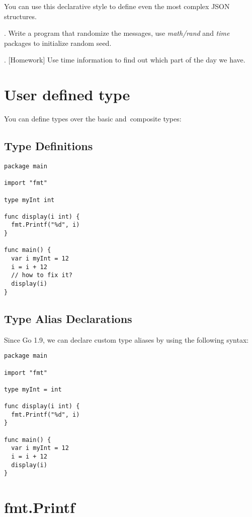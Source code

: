\documentclass[11pt, letterpaper]{article}
\begin{document}
You can use this declarative style to define even the most complex {\small JSON} structures.

. Write a program that randomize the messages, use \emph{math/rand} and \emph{time} packages to initialize random seed.

. [Homework] Use time information to find out which part of the day we have.

\section{User defined type}

You can define types over the basic and~composite types:

\subsection{Type Definitions}

\begin{verbatim}
package main

import "fmt"

type myInt int

func display(i int) {
  fmt.Printf("%d", i)
}

func main() {
  var i myInt = 12
  i = i + 12
  // how to fix it?
  display(i)
}
\end{verbatim}

\subsection{Type Alias Declarations}

Since Go 1.9, we can declare custom type aliases by using the following syntax:

\begin{verbatim}
package main

import "fmt"

type myInt = int

func display(i int) {
  fmt.Printf("%d", i)
}

func main() {
  var i myInt = 12
  i = i + 12
  display(i)
}
\end{verbatim}

\section{fmt.Printf}
\end{document}

